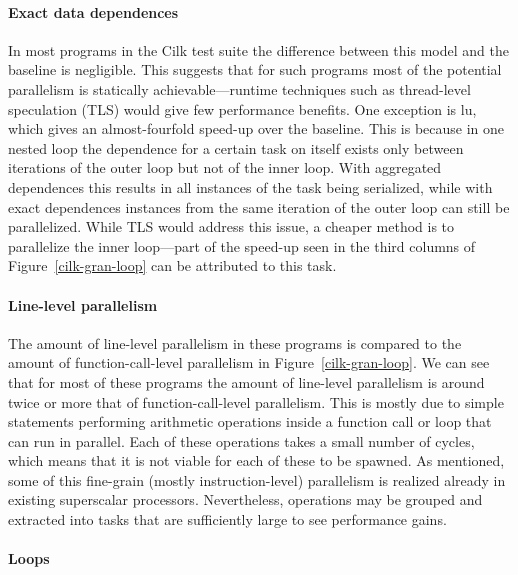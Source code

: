 \paragraph{Exact data dependences}
In most programs in the Cilk test suite the difference between this model and the baseline is negligible.
This suggests that for such programs most of the potential parallelism is statically achievable---runtime techniques such as thread-level speculation (TLS) would give few performance benefits.
One exception is \textsf{lu}, which gives an almost-fourfold speed-up over the baseline.
This is because in one nested loop the dependence for a certain task on itself exists only between iterations of the outer loop but not of the inner loop.
With aggregated dependences this results in all instances of the task being serialized, while with exact dependences instances from the same iteration of the outer loop can still be parallelized.
While TLS would address this issue, a cheaper method is to parallelize the inner loop---part of the speed-up seen in the third columns of Figure~\ref{cilk-gran-loop} can be attributed to this task.

\paragraph{Line-level parallelism}

The amount of line-level parallelism in these programs is compared to the amount of function-call-level parallelism in Figure~\ref{cilk-gran-loop}.
We can see that for most of these programs the amount of line-level parallelism is around twice or more that of function-call-level parallelism.
This is mostly due to simple statements performing arithmetic operations inside a function call or loop that can run in parallel.
Each of these operations takes a small number of cycles, which means that it is not viable for each of these to be spawned.
As mentioned, some of this fine-grain (mostly instruction-level) parallelism is realized already in existing superscalar processors.
Nevertheless, operations may be grouped and extracted into tasks that are sufficiently large to see performance gains.

\paragraph{Loops}

